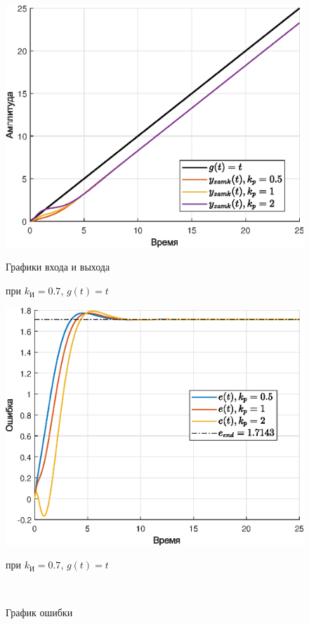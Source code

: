 \documentclass[a4paper]{article}
\begin{document}
\begin{figure}[H]
    \begin{minipage}{0.5\textwidth}
        \centering \includegraphics[width=\textwidth]{ex5/ki_0.7_g_vt.eps}
        \caption{Графики входа и выхода}
        \centerline{при $k_{\text{И}} = 0.7$, $g(t)=t$}
    \end{minipage}\hfill
    \begin{minipage}{0.5\textwidth}
        \centering \includegraphics[width=\textwidth]{ex5/ki_0.7_g_vt_error.eps}
        \caption{График ошибки}
        \centerline{при $k_{\text{И}} = 0.7$, $g(t)=t$}
    \end{minipage}\\[1em]
\end{figure}\noindent\
\end{document}
